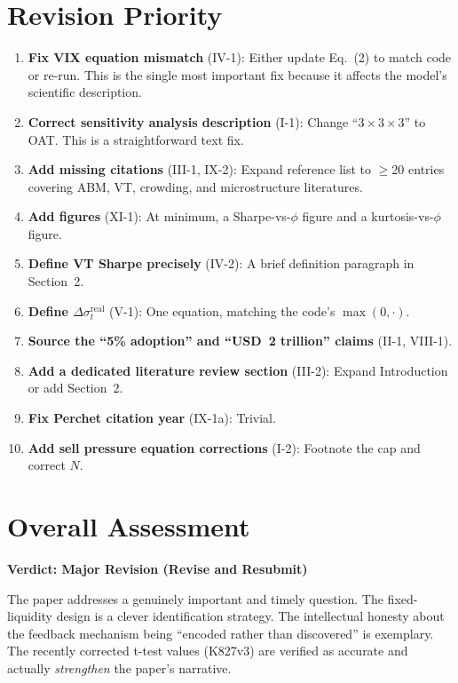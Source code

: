 \documentclass[12pt,a4paper]{article}
\begin{document}
\section*{Revision Priority}

\begin{enumerate}
  \item \textbf{Fix VIX equation mismatch} (IV-1): Either update Eq.~(2) to match code or re-run. This is the single most important fix because it affects the model's scientific description.
  \item \textbf{Correct sensitivity analysis description} (I-1): Change ``$3\times3\times3$'' to OAT. This is a straightforward text fix.
  \item \textbf{Add missing citations} (III-1, IX-2): Expand reference list to $\geq$20 entries covering ABM, VT, crowding, and microstructure literatures.
  \item \textbf{Add figures} (XI-1): At minimum, a Sharpe-vs-$\phi$ figure and a kurtosis-vs-$\phi$ figure.
  \item \textbf{Define VT Sharpe precisely} (IV-2): A brief definition paragraph in Section~2.
  \item \textbf{Define $\Delta\sigma^{\text{real}}_t$} (V-1): One equation, matching the code's $\max(0,\cdot)$.
  \item \textbf{Source the ``5\% adoption'' and ``USD~2 trillion'' claims} (II-1, VIII-1).
  \item \textbf{Add a dedicated literature review section} (III-2): Expand Introduction or add Section~2.
  \item \textbf{Fix Perchet citation year} (IX-1a): Trivial.
  \item \textbf{Add sell pressure equation corrections} (I-2): Footnote the cap and correct $N$.
\end{enumerate}


\section*{Overall Assessment}

\textbf{Verdict: Major Revision (Revise and Resubmit)}

The paper addresses a genuinely important and timely question. The fixed-liquidity design is a clever identification strategy. The intellectual honesty about the feedback mechanism being ``encoded rather than discovered'' is exemplary. The recently corrected t-test values (K827v3) are verified as accurate and actually \emph{strengthen} the paper's narrative.
\end{document}
